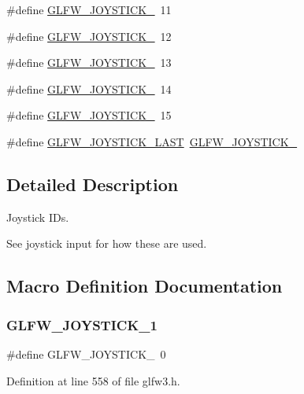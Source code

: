 \begin{DoxyCompactItemize}
\#define \mbox{\hyperlink{group__joysticks_gab91bbf5b7ca6be8d3ac5c4d89ff48ac7}{G\+L\+F\+W\+\_\+\+J\+O\+Y\+S\+T\+I\+C\+K\+\_}}~11
\item 
\#define \mbox{\hyperlink{group__joysticks_ga5c84fb4e49bf661d7d7c78eb4018c508}{G\+L\+F\+W\+\_\+\+J\+O\+Y\+S\+T\+I\+C\+K\+\_}}~12
\item 
\#define \mbox{\hyperlink{group__joysticks_ga89540873278ae5a42b3e70d64164dc74}{G\+L\+F\+W\+\_\+\+J\+O\+Y\+S\+T\+I\+C\+K\+\_}}~13
\item 
\#define \mbox{\hyperlink{group__joysticks_ga7b02ab70daf7a78bcc942d5d4cc1dcf9}{G\+L\+F\+W\+\_\+\+J\+O\+Y\+S\+T\+I\+C\+K\+\_}}~14
\item 
\#define \mbox{\hyperlink{group__joysticks_ga453edeeabf350827646b6857df4f80ce}{G\+L\+F\+W\+\_\+\+J\+O\+Y\+S\+T\+I\+C\+K\+\_}}~15
\item 
\#define \mbox{\hyperlink{group__joysticks_ga9ca13ebf24c331dd98df17d84a4b72c9}{G\+L\+F\+W\+\_\+\+J\+O\+Y\+S\+T\+I\+C\+K\+\_\+\+L\+A\+ST}}~\mbox{\hyperlink{group__joysticks_ga453edeeabf350827646b6857df4f80ce}{G\+L\+F\+W\+\_\+\+J\+O\+Y\+S\+T\+I\+C\+K\+\_}}
\end{DoxyCompactItemize}


\subsection{Detailed Description}
Joystick I\+Ds. 

See joystick input for how these are used. 

\subsection{Macro Definition Documentation}
\mbox{\label{group__joysticks_ga34a0443d059e9f22272cd4669073f73d}} 
\subsubsection{\texorpdfstring{GLFW\_JOYSTICK\_1}{GLFW\_JOYSTICK\_1}}
{\footnotesize\ttfamily \#define G\+L\+F\+W\+\_\+\+J\+O\+Y\+S\+T\+I\+C\+K\+\_~0}



Definition at line 558 of file glfw3.\+h.

\mbox{\label{group__joysticks_gaef55389ee605d6dfc31aef6fe98c54ec}} 

